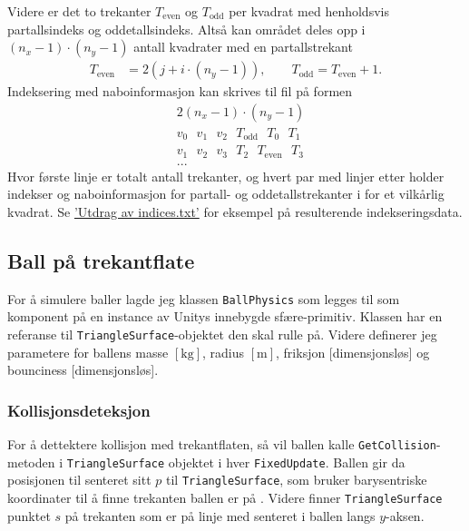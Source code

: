 \documentclass[norsk, doc, 11pt, a4paper]{apa7}  %
\begin{document}
Videre er det to trekanter \(T_{\text{even}}\) og \(T_{\text{odd}}\) per kvadrat med henholdsvis partallsindeks og oddetallsindeks.
Altså kan området deles opp i \((n_{x}-1)\cdot (n_{y}-1)\) antall kvadrater med en partallstrekant
\begin{align*}
 	T_{\text{even}} &= 2(j + i\cdot (n_{y}-1)), \qquad T_{\text{odd}} = T_{\text{even}} + 1.
\end{align*} 
Indeksering med naboinformasjon kan skrives til fil på formen
\begin{align*}
	&2(n_{x}-1)\cdot (n_{y}-1) \\
	& v_{0}\text{ } v_{1}\text{ } v_{2}\text{ } T_{\text{odd}}\text{ } T_{0}\text{ } T_{1} \\
	& v_{1}\text{ } v_{2}\text{ } v_{3}\text{ } T_{2}\text{ } T_{\text{even}}\text{ } T_{3} \\
	&...
\end{align*}
Hvor første linje er totalt antall trekanter, og hvert par med linjer etter holder indekser og naboinformasjon for partall- og oddetallstrekanter i for et vilkårlig kvadrat. Se \hyperref[ap:vert]{'Utdrag av indices.txt'} for eksempel på resulterende indekseringsdata.

\subsection{Ball på trekantflate}
For å simulere baller lagde jeg klassen \verb+BallPhysics+ som legges til som komponent på en instance av Unitys innebygde sfære-primitiv. Klassen har en referanse til \verb+TriangleSurface+-objektet den skal rulle på. Videre definerer jeg parametere for ballens masse \([\si{\kilogram}]\), radius \([\si{\metre}]\), friksjon [dimensjonsløs] og bounciness [dimensjonsløs].

\subsubsection{Kollisjonsdeteksjon} \label{sec:3:A}
For å dettektere kollisjon med trekantflaten, så vil ballen kalle \verb+GetCollision+-metoden i \verb+TriangleSurface+ objektet i hver \verb+FixedUpdate+. Ballen gir da posisjonen til senteret sitt \(p\) til \verb+TriangleSurface+, som bruker barysentriske koordinater til å finne trekanten ballen er på \parencite[ss.78-79]{nylundMAT301MatematikkIII2023}. Videre finner \verb+TriangleSurface+ punktet \(s\) på trekanten som er på linje med senteret i ballen langs \(y\)-aksen.
\end{document}
